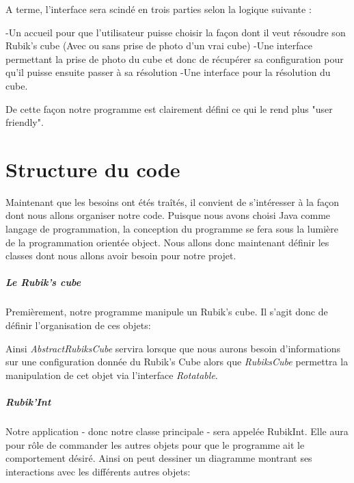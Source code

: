 \documentclass[a4paper]{report}
\begin{document}
A terme, l'interface sera scindé en trois parties selon la logique suivante :

	-Un accueil pour que l'utilisateur puisse choisir la façon dont il veut résoudre son Rubik's cube (Avec ou sans prise de photo d'un vrai cube)
	-Une interface permettant la prise de photo du cube et donc de récupérer sa configuration pour qu'il puisse ensuite passer à sa résolution
	-Une interface pour la résolution du cube.

De cette façon notre programme est clairement défini ce qui le rend plus "user friendly".


\chapter{Structure du code}

Maintenant que les besoins ont étés traîtés, il convient de s'intéresser à la façon dont nous allons organiser notre code. Puisque nous avons choisi Java comme langage de programmation, la conception du programme se fera sous la lumière de la programmation orientée object. Nous allons donc maintenant définir les classes dont nous allons avoir besoin pour notre projet.

\paragraph{Le Rubik's cube} Premièrement, notre programme manipule un Rubik's cube. Il s'agit donc de définir l'organisation de ces objets:

\begin{center}
\end{center}
Ainsi \textit{AbstractRubiksCube} servira lorsque que nous aurons besoin d'informations sur une configuration donnée du Rubik's Cube alors que \textit{RubiksCube} permettra la manipulation de cet objet via l'interface \textit{Rotatable}. 


\paragraph{Rubik'Int} Notre application - donc notre classe principale - sera appelée RubikInt. Elle aura pour rôle de commander les autres objets pour que le programme ait le comportement désiré. Ainsi on peut dessiner un diagramme montrant ses interactions avec les différents autres objets:
\end{document}
